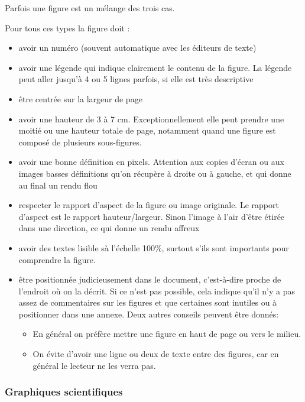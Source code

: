Parfois une figure est un mélange des trois cas.

Pour tous ces types la figure doit :
\begin{itemize}
\item avoir un numéro  (souvent automatique avec les éditeurs de texte)
\item avoir une légende qui indique clairement le contenu de la figure. La légende peut aller jusqu'à 4 ou 5 lignes parfois, si elle est très descriptive
\item  être centrée sur la largeur de page
\item  avoir une hauteur de 3 à 7 cm. Exceptionnellement elle peut prendre une moitié ou une hauteur totale de page, notamment quand une figure est composé de plusieurs sous-figures.
\item avoir une bonne définition en pixels. Attention aux copies d'écran ou aux images basses définitions qu'on récupère à droite ou à gauche, et qui donne au final un rendu flou
\item respecter le rapport d'aspect de la figure ou image originale. Le rapport d'aspect est le rapport hauteur/largeur. Sinon l'image à l'air d'être étirée dans une direction, ce qui donne un rendu affreux
\item  avoir des  textes  lisible sà l'échelle  100\%, surtout  s'ils sont importants pour comprendre la figure.
\item être positionnée judicieusement dans le document, c'est-à-dire proche de l'endroit où on la décrit. Si ce n'est pas possible, cela indique qu'il n'y a pas assez de commentaires sur les figures et que certaines sont inutiles ou à positionner dans une annexe. 
Deux autres conseils peuvent être donnés:
\begin{itemize}
\item En général on préfère mettre une figure en haut de page ou vers le milieu. 
\item On évite d'avoir une ligne ou deux de texte entre des figures, car en général le lecteur ne les verra pas.
\end{itemize}


\end{itemize}

\subsubsection{Graphiques scientifiques}

